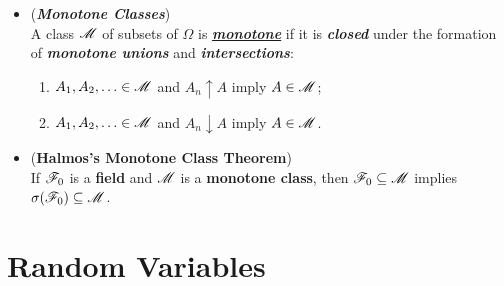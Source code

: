 \documentclass[11pt]{article}
\begin{document}
\begin{itemize}
\item \begin{definition} (\emph{\textbf{Monotone Classes}})\\
A class ${\mathscr M}$ of subsets of $\Omega$ is \underline{\emph{\textbf{monotone}}} if it is \emph{\textbf{closed}} under the formation of \emph{\textbf{monotone unions}} and \emph{\textbf{intersections}}:
\begin{enumerate}
\item $A_1, A_2,\ldots \in {\mathscr M}$ and $A_n \uparrow A$ imply $A \in {\mathscr M}$;
\item $A_1, A_2,\ldots \in {\mathscr M}$ and $A_n \downarrow A$ imply $A \in {\mathscr M}$.
\end{enumerate}
\end{definition}

\item \begin{theorem} (\textbf{Halmos's Monotone Class Theorem}) \citep{resnick2013probability}\\
If ${\mathscr F}_0$ is a \textbf{field} and ${\mathscr M}$ is a \textbf{monotone class}, then ${\mathscr F}_0 \subseteq {\mathscr M}$ implies $\sigma({\mathscr F}_0) \subseteq {\mathscr M}$.
\end{theorem}
\end{itemize}


\section{Random Variables}
\end{document}
